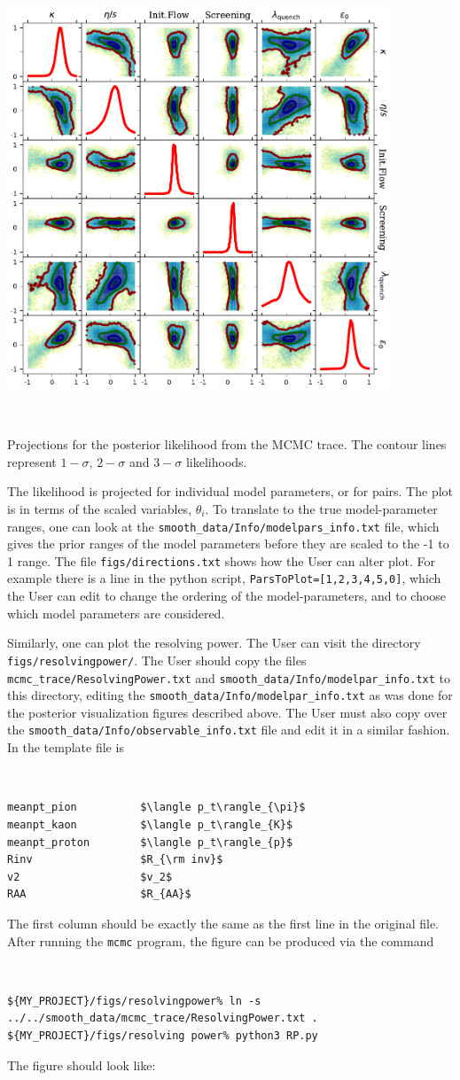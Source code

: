 \documentclass[UserManual.tex]{subfiles}
\begin{document}
\parbox{4.5in}{\centerline{\includegraphics[width=4.5in]{figs/posterior_rhic.pdf}}}
~~\parbox{2.0in}{Projections for the posterior likelihood from the MCMC trace. The contour lines represent $1-\sigma$, $2-\sigma$ and $3-\sigma$ likelihoods.}

The likelihood is projected for individual model parameters, or for pairs. The plot is in terms of the scaled variables, $\theta_i$. To translate to the true model-parameter ranges, one can look at the {\tt smooth\_data/Info/modelpars\_info.txt} file, which gives the prior ranges of the model parameters before they are scaled to the -1 to 1 range. The file {\tt figs/directions.txt} shows how the User can alter plot. For example there is a line in the python script, {\tt ParsToPlot=[1,2,3,4,5,0]}, which the User can edit to change the ordering of the model-parameters, and to choose which model parameters are considered.

Similarly, one can plot the resolving power. The User can visit the directory {\tt figs/resolvingpower/}. The User should copy the files {\tt mcmc\_trace/ResolvingPower.txt} and {\tt smooth\_data/Info/modelpar\_info.txt} to this directory, editing the {\tt smooth\_data/Info/modelpar\_info.txt} as was done for the posterior visualization figures described above. The User must also copy over the {\tt smooth\_data/Info/observable\_info.txt} file and edit it in a similar fashion. In the template file is
{\tt
\begin{verbatim}
meanpt_pion          $\langle p_t\rangle_{\pi}$
meanpt_kaon          $\langle p_t\rangle_{K}$
meanpt_proton        $\langle p_t\rangle_{p}$
Rinv                 $R_{\rm inv}$
v2                   $v_2$
RAA                  $R_{AA}$
\end{verbatim}}
The first column should be exactly the same as the first line in the original file. After running the {\tt mcmc} program, the figure can be produced via the command
{\tt
\begin{verbatim}
${MY_PROJECT}/figs/resolvingpower% ln -s ../../smooth_data/mcmc_trace/ResolvingPower.txt .
${MY_PROJECT}/figs/resolving power% python3 RP.py
\end{verbatim}}
The figure should look like:
\end{document}
